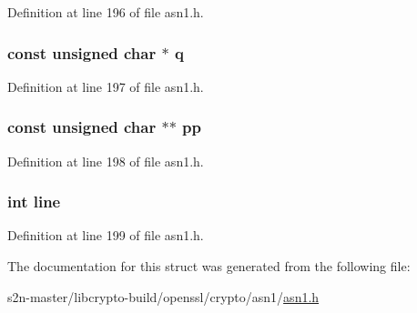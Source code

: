 Definition at line 196 of file asn1.\+h.

\subsubsection[{\texorpdfstring{q}{q}}]{\setlength{\rightskip}{0pt plus 5cm}const unsigned char $\ast$ q}\hypertarget{structasn1__const__ctx__st_af0cf94d7bf6ad965815c9265c762831a}{}\label{structasn1__const__ctx__st_af0cf94d7bf6ad965815c9265c762831a}


Definition at line 197 of file asn1.\+h.

\subsubsection[{\texorpdfstring{pp}{pp}}]{\setlength{\rightskip}{0pt plus 5cm}const unsigned char $\ast$$\ast$ pp}\hypertarget{structasn1__const__ctx__st_a3fbceb40ae8245599c29fb3ba118fb2f}{}\label{structasn1__const__ctx__st_a3fbceb40ae8245599c29fb3ba118fb2f}


Definition at line 198 of file asn1.\+h.

\subsubsection[{\texorpdfstring{line}{line}}]{\setlength{\rightskip}{0pt plus 5cm}int line}\hypertarget{structasn1__const__ctx__st_a41ebd28ef1d7c6ade45642cb6acc1039}{}\label{structasn1__const__ctx__st_a41ebd28ef1d7c6ade45642cb6acc1039}


Definition at line 199 of file asn1.\+h.



The documentation for this struct was generated from the following file\+:\begin{DoxyCompactItemize}
\item 
s2n-\/master/libcrypto-\/build/openssl/crypto/asn1/\hyperlink{crypto_2asn1_2asn1_8h}{asn1.\+h}\end{DoxyCompactItemize}
